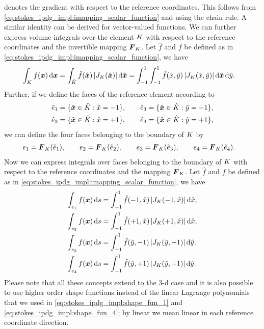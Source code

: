 \documentclass{scrreprt}
\begin{document}
denotes the gradient with respect to the reference coordinates. This follows
from \eqref{eq:stokes_ipdg_impl:imapping_scalar_function} and using the chain rule.
A similar identity can be derived for vector-valued functions.
We can further express volume integrals over the element $K$ 
with respect to the reference coordinates and the invertible mapping ${\boldsymbol F}_{K}$.
Let $\hat{f}$ and $f$ be defined as in \eqref{eq:stokes_ipdg_impl:imapping_scalar_function},
we have
\begin{align}
\int_K f({\boldsymbol x})\,\text{d}{\boldsymbol x} &= \int_{\hat{K}} \hat{f}(\hat{{\boldsymbol x}})\,|J_K(\hat{{\boldsymbol x}})|\,\textup{d}\hat{{\boldsymbol x}}
=
\int_{-1}^1\int_{-1}^1 \hat{f}(\hat{x},\hat{y})\,|J_K(\hat{x},\hat{y})|\,\textup{d}\hat{{\boldsymbol x}}\,\textup{d}\hat{y}.
\notag
\end{align}
Further, if we define the faces of the reference element according to
\begin{align}
\hat{e}_{1} &= \{ \hat{{\boldsymbol x}} \in \hat{K} : \hat{x} = -1\},\qquad
\hat{e}_{3} = \{ \hat{{\boldsymbol x}} \in \hat{K} : \hat{y} = -1\},
\notag\\
\hat{e}_{2} &= \{ \hat{{\boldsymbol x}} \in \hat{K} : \hat{x} = +1\},\qquad
\hat{e}_{4} = \{ \hat{{\boldsymbol x}} \in \hat{K} : \hat{y} = +1\},
\notag
\end{align}
we can define the four faces belonging to the boundary of $K$ by
\begin{align}
e_{1} &= {\boldsymbol F}_{K}(\hat{e}_1),\qquad
e_{2} = {\boldsymbol F}_{K}(\hat{e}_2),\qquad
e_{3} = {\boldsymbol F}_{K}(\hat{e}_3),\qquad
e_{4} = {\boldsymbol F}_{K}(\hat{e}_4).
\notag
\end{align}
Now we can express integrals over faces belonging to the boundary of $K$ with respect to 
the reference coordinates and the mapping ${\boldsymbol F}_{K}$.
Let $\hat{f}$ and $f$ be defined as in \eqref{eq:stokes_ipdg_impl:imapping_scalar_function},
we have
\begin{align}
\int_{e_1} f({\boldsymbol x})\,\text{d}s &=
\int_{-1}^1\hat{f}(-1,\hat{x})\,|J_K(-1,\hat{x})|\,\textup{d}\hat{x}, 
\notag\\
\int_{e_2} f({\boldsymbol x})\,\text{d}s &=
\int_{-1}^1\hat{f}(+1,\hat{x})\,|J_K(+1,\hat{x})|\,\textup{d}\hat{x},
\notag\\
\int_{e_3} f({\boldsymbol x})\,\text{d}s &=
\int_{-1}^1\hat{f}(\hat{y},-1)\,|J_K(\hat{y},-1)|\,\textup{d}\hat{y},
\notag\\
\int_{e_4} f({\boldsymbol x})\,\text{d}s &=
\int_{-1}^1\hat{f}(\hat{y},+1)\,|J_K(\hat{y},+1)|\,\textup{d}\hat{y}.
\notag
\end{align}
Please note that all these concepts extend to the 3-d case and it is also
possible to use higher order shape functions instead of the linear 
Lagrange polynomials that we used in \eqref{eq:stokes_ipdg_impl:shape_fun_1} and 
\eqref{eq:stokes_ipdg_impl:shape_fun_4}; by linear we mean 
linear in each reference coordinate direction.
\end{document}
